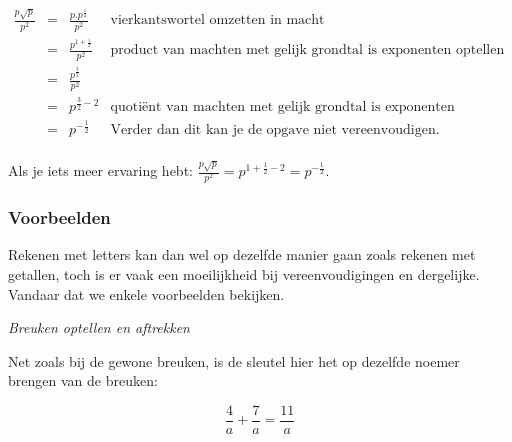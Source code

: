 	\begin{voorbeeld}
	\ \\
	\begin{math}
	\begin{array}{ccc|r}
	{\displaystyle \frac{p\sqrt{p}}{p^{2}}} & = & {\displaystyle \frac{p.p^{\frac{1}{2}}}{p^{2}}} &   \text{vierkantswortel omzetten in macht}\\
	& = & {\displaystyle \frac{p^{1+\frac{1}{2}}}{p^{2}}} &  \text{product van machten met gelijk grondtal is exponenten optellen}\\
	& = & {\displaystyle \frac{p^{\frac{3}{2}}}{p^{2}}} &  \\
	& = & {\displaystyle p^{\frac{3}{2}-2}} &  \text{quoti\"ent van machten met gelijk grondtal is exponenten aftrekken}\\
	& = & {\displaystyle p^{-\frac{1}{2}}} &  \text{Verder dan dit kan je de opgave niet vereenvoudigen.}\\
	\end{array}
	\end{math}
	
	\end{voorbeeld}
	
	Als je iets meer ervaring hebt: $\frac{p\sqrt{p}}{p^{2}}=p^{1+\frac{1}{2}-2}={\displaystyle p^{-\frac{1}{2}}}$.


\subsubsection{Voorbeelden}

Rekenen met letters kan dan wel op dezelfde manier gaan
zoals rekenen met getallen, toch is er vaak een moeilijkheid bij vereenvoudigingen
en dergelijke. Vandaar dat we enkele voorbeelden bekijken.

	\emph{Breuken optellen en aftrekken}
	
	\begin{voorbeeld}
		Net zoals bij de gewone breuken, is de sleutel hier het
	op dezelfde noemer brengen van de breuken:
	
	\begin{equation*}
	{\displaystyle \frac{4}{a}+\frac{7}{a}=\frac{11}{a}}
	\end{equation*}
	\end{voorbeeld}
	
